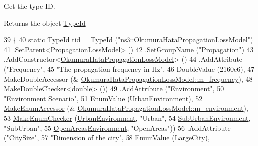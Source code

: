 Get the type ID. 

\begin{DoxyReturn}{Returns}
the object \hyperlink{classns3_1_1TypeId}{Type\+Id} 
\end{DoxyReturn}

\begin{DoxyCode}
39 \{
40   \textcolor{keyword}{static} TypeId tid = TypeId (\textcolor{stringliteral}{"ns3::OkumuraHataPropagationLossModel"})
41     .SetParent<\hyperlink{classns3_1_1PropagationLossModel_ace8b78c2c8e805cd0a919d7e3543318c}{PropagationLossModel}> ()
42     .SetGroupName (\textcolor{stringliteral}{"Propagation"})
43     .AddConstructor<\hyperlink{classns3_1_1OkumuraHataPropagationLossModel_a85807746cab4ae5198583a046c323d28}{OkumuraHataPropagationLossModel}> ()
44     .AddAttribute (\textcolor{stringliteral}{"Frequency"},
45                    \textcolor{stringliteral}{"The propagation frequency in Hz"},
46                    DoubleValue (2160e6),
47                    MakeDoubleAccessor (&
      \hyperlink{classns3_1_1OkumuraHataPropagationLossModel_a2d67bf9147293b68bdd251c527a9b099}{OkumuraHataPropagationLossModel::m\_frequency}),
48                    MakeDoubleChecker<double> ())
49     .AddAttribute (\textcolor{stringliteral}{"Environment"},
50                    \textcolor{stringliteral}{"Environment Scenario"},
51                    EnumValue (\hyperlink{group__propagation_gga0e392ed771a28c92112047e63308a53aad575d1b07ccac0218783bbd0f523784c}{UrbanEnvironment}),
52                    \hyperlink{namespacens3_af5050739867ce63896dec011e332c8ec}{MakeEnumAccessor} (&
      \hyperlink{classns3_1_1OkumuraHataPropagationLossModel_a2b91de7c6c22099b42d6822e47116928}{OkumuraHataPropagationLossModel::m\_environment}),
53                    \hyperlink{namespacens3_a48832781a2b521d3d0091e05ece30615}{MakeEnumChecker} (\hyperlink{group__propagation_gga0e392ed771a28c92112047e63308a53aad575d1b07ccac0218783bbd0f523784c}{UrbanEnvironment}, \textcolor{stringliteral}{"Urban"},
54                                     \hyperlink{group__propagation_gga0e392ed771a28c92112047e63308a53aa06cbfe108cde1eb2070702b2ed4fb189}{SubUrbanEnvironment}, \textcolor{stringliteral}{"SubUrban"},
55                                     \hyperlink{group__propagation_gga0e392ed771a28c92112047e63308a53aa51f78effebc3753d7cd2ee9b5924c028}{OpenAreasEnvironment}, \textcolor{stringliteral}{"OpenAreas"}))
56     .AddAttribute (\textcolor{stringliteral}{"CitySize"},
57                    \textcolor{stringliteral}{"Dimension of the city"},
58                    EnumValue (\hyperlink{group__propagation_gga29c9a1b1a58b6a56054ff5ea4c5a574da017d6be2af0a102a6147e6519d63f54c}{LargeCity}),

\end{DoxyCode}

